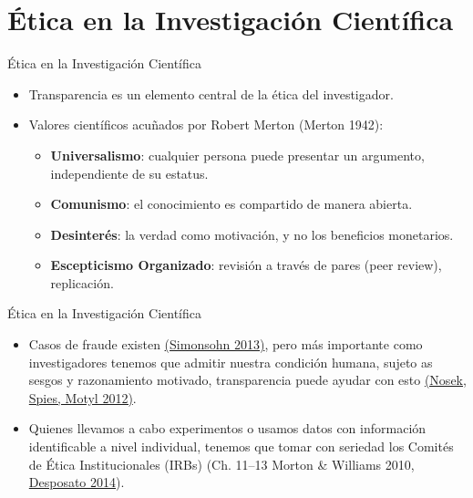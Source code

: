 \documentclass{beamer}
\begin{document}


\section{Ética en la Investigación Científica}
\begin{frame}{Ética en la Investigación Científica}
\begin{itemize}
\item Transparencia es un elemento central de la ética del investigador.

\item Valores científicos acuñados por Robert Merton (Merton 1942):
\begin{itemize}[<.->]
\item \textbf{Universalismo}: cualquier persona puede presentar un argumento, independiente de su estatus.
\item \textbf{Comunismo}: el conocimiento es compartido de manera abierta.
\item \textbf{Desinterés}: la verdad como motivación, y no los beneficios monetarios.
\item \textbf{Escepticismo Organizado}: revisión a través de pares (peer review), replicación.
\end{itemize}
\end{itemize}
\end{frame}

\begin{frame}{Ética en la Investigación Científica}
\begin{itemize}
\item
Casos de fraude existen \href{http://pss.sagepub.com/content/24/10/1875}{(Simonsohn 2013)}, pero más importante como investigadores tenemos que admitir nuestra condición humana, sujeto as sesgos y razonamiento motivado, transparencia puede ayudar con esto \href{http://pps.sagepub.com/content/7/6/615.short}{(Nosek, Spies, Motyl 2012)}.
\item
Quienes llevamos a cabo experimentos o usamos datos con información identificable a nivel individual, tenemos que tomar con seriedad los Comités de Ética Institucionales (IRBs) (Ch. 11--13 Morton \& Williams 2010, \href{http://desposato.org/ethicsfieldexperiments.pdf}{Desposato 2014}). 
\end{itemize}
\end{frame}
\end{document}
